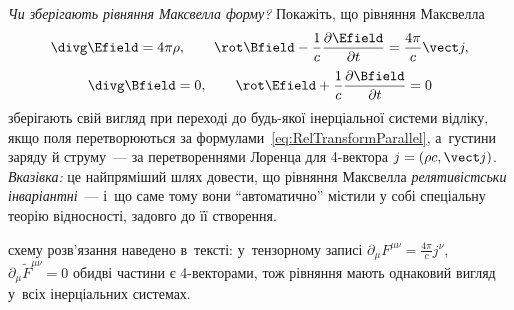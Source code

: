 \begin{problem}\label{prb:MaxwellInvariance}
	\emph{Чи зберігають рівняння Максвелла форму?} Покажіть, що рівняння Максвелла
	\begin{equation*}
		\divg\Efield = 4\pi\rho, \qquad \rot\Bfield -
		\frac1c\frac{\partial\Efield}{\partial t} = \frac{4\pi}{c}\vect j,
	\end{equation*}
	\begin{equation*}
		\divg\Bfield = 0, \qquad \rot\Efield + \frac1c\frac{\partial\Bfield}{\partial t} =
		0
	\end{equation*}
	зберігають свій вигляд при переході до будь-якої інерціальної системи відліку, якщо
	поля перетворюються за формулами~\eqref{eq:RelTransformParallel}, а~густини заряду й
	струму~--- за перетвореннями Лоренца для 4-вектора $j = (\rho c, \vect j)$.
	\emph{Вказівка:} це найпряміший шлях довести, що рівняння Максвелла
	\emph{релятивістськи інваріантні}~--- і~що саме тому вони \enquote{автоматично} містили у
	собі спеціальну теорію відносності, задовго до її створення.
	\begin{solution}
		схему розв'язання наведено в~тексті: у~тензорному записі $\partial_\mu F^{\mu\nu}=\frac{4\pi}{c}j^\nu$, $\partial_\mu\tilde F^{\mu\nu}=0$ обидві частини є 4-векторами, тож рівняння мають однаковий вигляд у~всіх інерціальних системах.
	\end{solution}
\end{problem}

